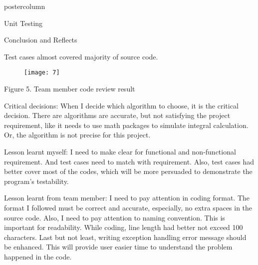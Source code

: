 \documentclass[final,hyperref={pdfpagelabels=false}]{beamer}
\begin{document}
\begin{frame}
\begin{columns}
\begin{column}{.49\textwidth}
\begin{beamercolorbox}[center,wd=\textwidth]{postercolumn}
\begin{minipage}[T]{.95\textwidth}
{\begin{block}{Unit Testing}
            \end{block}
            \vfill
            
            
 \begin{footnotesize}           
            \begin{block}{Conclusion and Reflects}
           
            
                  \begin{itemize}
            
            \item Test cases almost covered majority of source code. 
                                   
\begin{figure}[h]
\begin{center}
\texttt{[image: 7]} 
\end{center}
\end{figure}
              
            Figure 5. Team member code review result
           {\small   \item  Critical decisions: When I decide which algorithm to choose, it is the critical decision. There are algorithms are accurate, but not satisfying the project requirement, like it needs to use math packages to simulate integral calculation. Or, the algorithm is not precise for this project. }
              
             {\small   \item Lesson learnt myself:  I need to make clear for functional and non-functional requirement. And test cases need to match with requirement. Also, test cases had better cover most of the codes, which will be more persuaded to demonstrate the program's testability. }
              
           {\small     \item Lesson learnt from team member: I need to pay attention in coding format. The format I followed must be correct and accurate, especially, no extra spaces in the source code. Also, I need to pay attention to naming convention. This is important for readability. While coding, line length had better not exceed 100 characters. Last but not least, writing exception handling error message should be enhanced. This will provide user easier time to understand the problem happened in the code. }
   
                  \end{itemize}
        

\end{block}
\end{footnotesize}}
\end{minipage}
\end{beamercolorbox}
\end{column}
\end{columns}
\end{frame}
\end{document}
